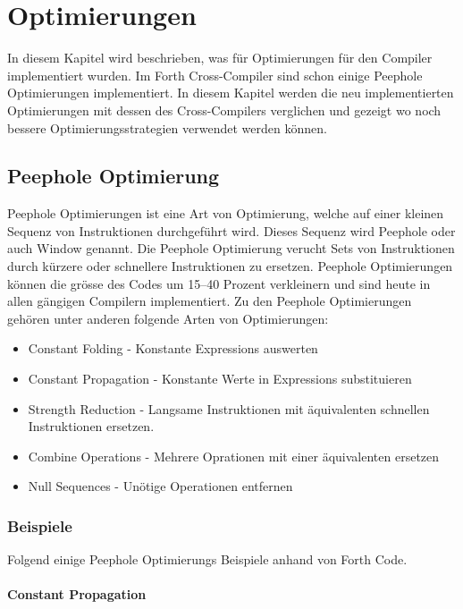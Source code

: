 \chapter{Optimierungen}
\label{chap:optimizer}
In diesem Kapitel wird beschrieben, was für Optimierungen für den Compiler implementiert wurden. Im Forth Cross-Compiler sind schon einige Peephole Optimierungen implementiert. In diesem Kapitel werden die neu implementierten Optimierungen mit dessen des Cross-Compilers verglichen und gezeigt wo noch bessere Optimierungsstrategien verwendet werden können.

\section{Peephole Optimierung}

Peephole Optimierungen ist eine Art von Optimierung, welche auf einer kleinen Sequenz von Instruktionen durchgeführt wird. Dieses Sequenz wird Peephole oder auch Window genannt. Die Peephole Optimierung verucht Sets von Instruktionen durch kürzere oder schnellere Instruktionen zu ersetzen.\cite{peepwiki} Peephole Optimierungen können die grösse des Codes um 15--40 Prozent verkleinern und sind heute in allen gängigen Compilern implementiert.\cite{peepdavidson} Zu den Peephole Optimierungen gehören unter anderen folgende Arten von Optimierungen:

\begin{itemize} 
	\item Constant Folding - Konstante Expressions auswerten
	\item Constant Propagation - Konstante Werte in Expressions substituieren
	\item Strength Reduction - Langsame Instruktionen mit äquivalenten schnellen Instruktionen ersetzen.
	\item Combine Operations - Mehrere Oprationen mit einer äquivalenten ersetzen
	\item Null Sequences - Unötige Operationen entfernen\cite{peepwiki}
\end{itemize}

\newpage

\subsection{Beispiele}

Folgend einige Peephole Optimierungs Beispiele anhand von Forth Code.

\subsubsection{Constant Propagation}
\label{constantprogationsection}

